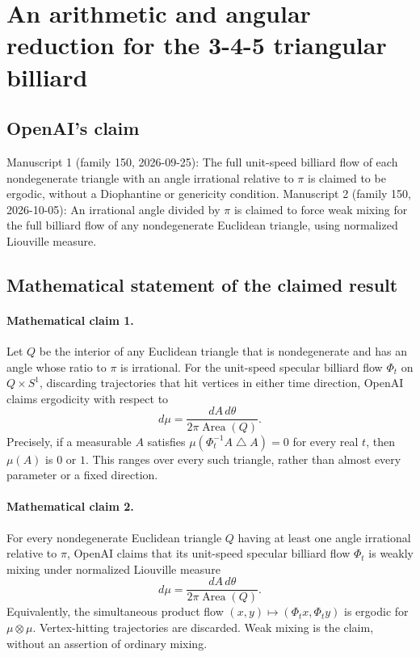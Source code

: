 \documentclass[11pt]{article}
\begin{document}
\section*{An arithmetic and angular reduction for the 3-4-5 triangular billiard}

\subsection{OpenAI's claim}
Manuscript 1 (family 150, 2026-09-25): The full unit-speed billiard flow of each nondegenerate triangle with an angle irrational relative to $\pi$ is claimed to be ergodic, without a Diophantine or genericity condition. Manuscript 2 (family 150, 2026-10-05): An irrational angle divided by $\pi$ is claimed to force weak mixing for the full billiard flow of any nondegenerate Euclidean triangle, using normalized Liouville measure.

\subsection{Mathematical statement of the claimed result}
\paragraph{Mathematical claim 1.} Let $Q$ be the interior of any Euclidean triangle that is nondegenerate and has an angle whose ratio to $\pi$ is irrational. For the unit-speed specular billiard flow $\Phi_t$ on $Q\times S^1$, discarding trajectories that hit vertices in either time direction, OpenAI claims ergodicity with respect to
\[
d\mu=\frac{dA\,d\theta}{2\pi\operatorname{Area}(Q)}.
\]
Precisely, if a measurable $A$ satisfies $\mu(\Phi_t^{-1}A\mathbin{\triangle} A)=0$ for every real $t$, then $\mu(A)$ is $0$ or $1$. This ranges over every such triangle, rather than almost every parameter or a fixed direction.

\paragraph{Mathematical claim 2.} For every nondegenerate Euclidean triangle $Q$ having at least one angle irrational relative to $\pi$, OpenAI claims that its unit-speed specular billiard flow $\Phi_t$ is weakly mixing under normalized Liouville measure
\[
d\mu=\frac{dA\,d\theta}{2\pi\operatorname{Area}(Q)}.
\]
Equivalently, the simultaneous product flow $(x,y)\mapsto(\Phi_tx,\Phi_ty)$ is ergodic for $\mu\otimes\mu$. Vertex-hitting trajectories are discarded. Weak mixing is the claim, without an assertion of ordinary mixing.
\end{document}
